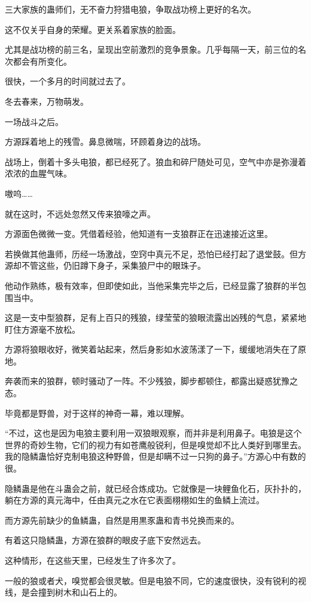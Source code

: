 \begin{this_body}
三大家族的蛊师们，无不奋力狩猎电狼，争取战功榜上更好的名次。

这不仅关乎自身的荣耀。更关系着家族的脸面。

尤其是战功榜的前三名，呈现出空前激烈的竞争景象。几乎每隔一天，前三位的名次都会有所变化。

很快，一个多月的时间就过去了。

冬去春来，万物萌发。

一场战斗之后。

方源踩着地上的残雪。鼻息微喘，环顾着身边的战场。

战场上，倒着十多头电狼，都已经死了。狼血和碎尸随处可见，空气中亦是弥漫着浓浓的血腥气味。

嗷呜……

就在这时，不远处忽然又传来狼嚎之声。

方源面色微微一变。凭借着经验，他知道有一支狼群正在迅速接近这里。

若换做其他蛊师，历经一场激战，空窍中真元不足，恐怕已经打起了退堂鼓。但方源却不管这些，仍旧蹲下身子，采集狼尸中的眼珠子。

他动作熟练，极有效率，但即使如此，当他采集完毕之后，已经显露了狼群的半包围当中。

这是一支中型狼群，足有上百只的残狼，绿莹莹的狼眼流露出凶残的气息，紧紧地盯住方源毫不放松。

方源将狼眼收好，微笑着站起来，然后身影如水波荡漾了一下，缓缓地消失在了原地。

奔袭而来的狼群，顿时骚动了一阵。不少残狼，脚步都顿住，都露出疑惑犹豫之态。

毕竟都是野兽，对于这样的神奇一幕，难以理解。

“不过，这也是因为电狼主要利用一双狼眼观察，而并非是利用鼻子。电狼是这个世界的奇妙生物，它们的视力有如苍鹰般锐利，但是嗅觉却不比人类好到哪里去。我的隐鳞蛊恰好克制电狼这种野兽，但是却瞒不过一只狗的鼻子。”方源心中有数的很。

隐鳞蛊是他在斗蛊会之前，就已经合炼成功。它就像是一块鲤鱼化石，灰扑扑的，躺在方源的真元海中，任由真元之水在它表面栩栩如生的鱼鳞上流过。

而方源先前缺少的鱼鳞蛊，自然是用黒豕蛊和青书兑换而来的。

有着这只隐鳞蛊，方源在狼群的眼皮子底下安然远去。

这种情形，在这些天里，已经发生了许多次了。

一般的狼或者犬，嗅觉都会很灵敏。但是电狼不同，它的速度很快，没有锐利的视线，是会撞到树木和山石上的。


\end{this_body}
